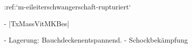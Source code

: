 :ref:`m-eileiterschwangerschaft-rupturiert`
\begin{itemize}
  -   |TxMassVitMKBes|
  \begin{itemize}
    -   Lagerung: Bauchdeckenentspannend.
    -   Schockbekämpfung
  \end{itemize}
\end{itemize}